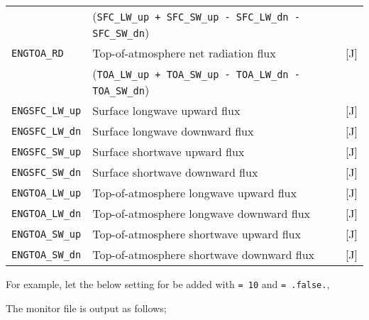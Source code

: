 \begin{table}[h]
\begin{center}
\begin{tabularx}{150mm}{|l|X|l|}
                          & (\verb|SFC_LW_up + SFC_SW_up - SFC_LW_dn - SFC_SW_dn|) & \\
      \verb|ENGTOA_RD|    & Top-of-atmosphere net radiation flux      & [J] \\
                          & (\verb|TOA_LW_up + TOA_SW_up - TOA_LW_dn - TOA_SW_dn|) & \\
      \verb|ENGSFC_LW_up| & Surface longwave  upward   flux           & [J] \\
      \verb|ENGSFC_LW_dn| & Surface longwave  downward flux           & [J] \\
      \verb|ENGSFC_SW_up| & Surface shortwave upward   flux           & [J] \\
      \verb|ENGSFC_SW_dn| & Surface shortwave downward flux           & [J] \\
      \verb|ENGTOA_LW_up| & Top-of-atmosphere longwave  upward   flux & [J] \\
      \verb|ENGTOA_LW_dn| & Top-of-atmosphere longwave  downward flux & [J] \\
      \verb|ENGTOA_SW_up| & Top-of-atmosphere shortwave upward   flux & [J] \\
      \verb|ENGTOA_SW_dn| & Top-of-atmosphere shortwave downward flux & [J] \\
    \hline
  \end{tabularx}
\end{center}
\end{table}

For example, let the below setting for  be added with  \verb|= 10| and  \verb|= .false.|,


\noindent
The monitor file is output as follows;

